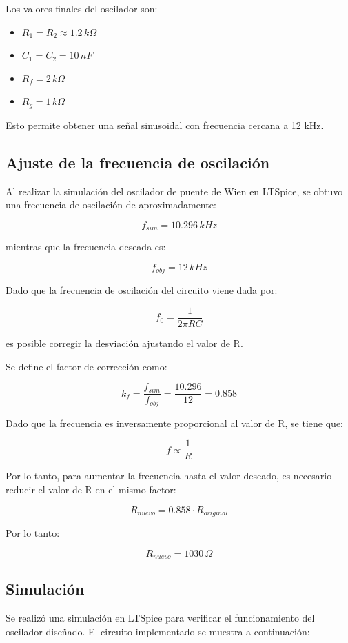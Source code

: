 \documentclass[12pt,a4paper]{article}
\begin{document}
Los valores finales del oscilador son:

\begin{itemize}
    \item \( R_1 = R_2 \approx 1.2\,k\Omega \)
    \item \( C_1 = C_2 = 10\,nF \)
    \item \( R_f = 2\,k\Omega \)
    \item \( R_g = 1\,k\Omega \)
\end{itemize}

Esto permite obtener una señal sinusoidal con frecuencia cercana a 12 kHz.

\subsection{Ajuste de la frecuencia de oscilación}

Al realizar la simulación del oscilador de puente de Wien en LTSpice, se obtuvo una frecuencia de oscilación de aproximadamente:

\[
f_{sim} = 10.296\,kHz
\]

mientras que la frecuencia deseada es:

\[
f_{obj} = 12\,kHz
\]

Dado que la frecuencia de oscilación del circuito viene dada por:

\[
f_0 = \frac{1}{2\pi RC}
\]

es posible corregir la desviación ajustando el valor de R.
\newline

Se define el factor de corrección como:

\[
k_f = \frac{f_{sim}}{f_{obj}} = \frac{10.296}{12} = 0.858
\]

Dado que la frecuencia es inversamente proporcional al valor de R, se tiene que:

\[
f \propto \frac{1}{R}
\]

Por lo tanto, para aumentar la frecuencia hasta el valor deseado, es necesario reducir el valor de R en el mismo factor:

\[
R_{nuevo} = 0.858 \cdot R_{original}
\]

Por lo tanto:

\[
R_{nuevo} = 1030\,\Omega
\]

\subsection{Simulación}
Se realizó una simulación en LTSpice para verificar el funcionamiento del oscilador diseñado. El circuito implementado se muestra a continuación:
\end{document}
